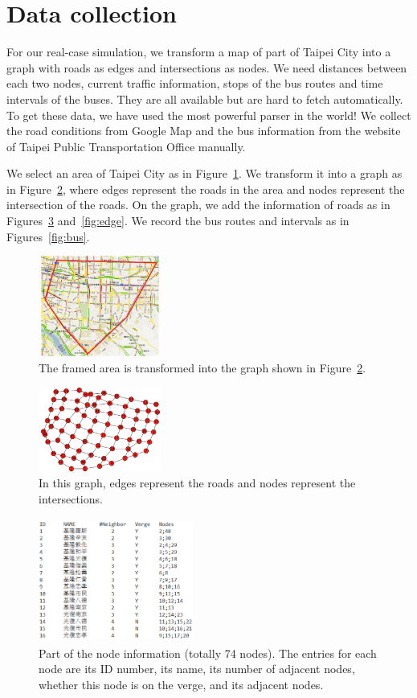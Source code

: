 \documentclass{sig-alternate}
\begin{document}
\section{Data collection}
For our real-case simulation, we transform a map of part of Taipei City into a graph with roads as edges and intersections as nodes.
We need distances between each two nodes, current traffic information, stops of the bus routes and time intervals of the buses.
They are all available but are hard to fetch automatically.
To get these data, we have used the most powerful parser in the world!
We collect the road conditions from Google Map and the bus information from the website of Taipei Public Transportation Office manually.

We select an area of Taipei City as in Figure~\ref{fig:tpemap}.
We transform it into a graph as in Figure~\ref{fig:graphex}, where edges represent the roads in the area and nodes represent the intersection of the roads.
On the graph, we add the information of roads as in Figures~\ref{fig:node} and~\ref{fig:edge}.
We record the bus routes and intervals as in Figures~\ref{fig:bus}.

\begin{figure}
\centering
\includegraphics[height=1.3in, width=1.6in]{taipeimap.eps}
\caption{The framed area is transformed into the graph shown in Figure~\ref{fig:graphex}.}
\label{fig:tpemap}
\end{figure}

\begin{figure}
\centering
\includegraphics[height=1.1in, width=1.6in]{graphexample.eps}
\caption{In this graph, edges represent the roads and nodes represent the intersections.}
\label{fig:graphex}
\end{figure}

\begin{figure}
\centering
\includegraphics[height=1.6in, width=2.0in]{node.eps}
\caption{Part of the node information (totally 74 nodes). The entries for each node are its ID number, its name, its number of adjacent nodes, whether this node is on the verge, and its adjacent nodes.}
\label{fig:node}
\end{figure}
\end{document}
